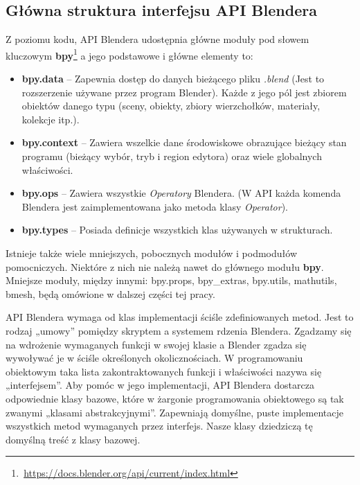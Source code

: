 \documentclass[brudnopis]{xmgr}
\begin{document}
\subsection{Główna struktura interfejsu API Blendera}
Z poziomu kodu, API Blendera udostępnia główne moduły pod słowem kluczowym \textbf{bpy}\footnote{\,\url{https://docs.blender.org/api/current/index.html}} a jego podstawowe i główne elementy to:
\begin{itemize}
\item \textbf{bpy.data} -- Zapewnia dostęp do danych bieżącego pliku \emph{.blend} (Jest to rozszerzenie używane przez program Blender). Każde z jego pól jest zbiorem obiektów danego typu (sceny, obiekty, zbiory wierzchołków, materiały, kolekcje itp.).
\item \textbf{bpy.context} -- Zawiera wszelkie dane środowiskowe obrazujące bieżący stan programu (bieżący wybór, tryb i region edytora) oraz wiele globalnych właściwości.
\item \textbf{bpy.ops} -- Zawiera wszystkie \emph{Operatory} Blendera. (W API każda komenda Blendera jest zaimplementowana jako metoda klasy \emph{Operator}).
\item \textbf{bpy.types} -- Posiada definicje wszystkich klas używanych w strukturach.
\end{itemize}
Istnieje także wiele mniejszych, pobocznych modułów i podmodułów pomocniczych. Niektóre z nich nie należą nawet do głównego modułu \textbf{bpy}. Mniejsze moduły, między innymi: bpy.props, bpy\_extras, bpy.utils, mathutils, bmesh, będą omówione w dalszej części tej pracy.

API Blendera wymaga od klas implementacji ściśle zdefiniowanych metod. Jest to rodzaj „umowy” pomiędzy skryptem a systemem rdzenia Blendera. Zgadzamy się na wdrożenie wymaganych funkcji w swojej klasie a Blender zgadza się wywoływać je w ściśle określonych okolicznościach. W programowaniu obiektowym taka lista zakontraktowanych funkcji i właściwości nazywa się „interfejsem”. Aby pomóc w jego implementacji, API Blendera dostarcza odpowiednie klasy bazowe, które w żargonie programowania obiektowego są tak zwanymi „klasami abstrakcyjnymi”. Zapewniają domyślne, puste implementacje wszystkich metod wymaganych przez interfejs. Nasze klasy dziedziczą tę domyślną treść z klasy bazowej.
\end{document}
